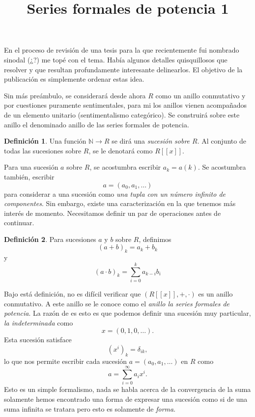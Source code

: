 \documentclass[letter,10pt,notitlepage]{article}
\title{Series formales de potencia 1}
\date{}
\theoremstyle{definition}
\newtheorem{definition}{Definición}
\theoremstyle{remark}
\begin{document}
\maketitle

En el proceso de revisión de una tesis para la que 
recientemente fui nombrado sinodal (¿?) me topé con 
el tema. Había algunos detalles quisquillosos que resolver
y que resultan profundamente interesante delinearlos. 
El objetivo de la publicación es simplemente ordenar 
estas idea.

Sin más preámbulo, se considerará desde ahora \( R\) 
como un anillo conmutativo y por cuestiones puramente 
sentimentales, para mi los anillos vienen acompañados de 
un elemento unitario (sentimentalismo categórico). 
Se construirá sobre este anillo el denominado anillo 
de las series formales de potencia.

\begin{definition}
  Una función \( \mathbb{N} \to R \) se dirá una 
  \emph{sucesión sobre \( R\)}. Al conjunto de todas 
  las sucesiones sobre \(R\), se le denotará como 
  \( R[[x]]\).
\end{definition}

Para una sucesión \(a\) sobre \(R\), se acostumbra 
escribir \(a_k = a(k)\). Se acostumbra también, escribir
\[ a = (a_0,a_1, \dots )\]
para considerar a una sucesión como 
\emph{una tupla con un número infinito de componentes}. 
Sin embargo, existe una caracterización en la que tenemos 
más interés de momento. Necesitamos definir un par de 
operaciones antes de continuar.

\begin{definition}
  Para sucesiones \(a\) y \(b\) sobre \(R\), definimos
  \[ (a + b)_k = a_k + b_k \]
  y
  \[ (a \cdot b)_k = \sum_{i=0}^ka_{k-i}b_{i}\]
\end{definition}

Bajo está definición, no es difícil verificar que 
\( (R[[x]],+,\cdot) \) es un anillo conmutativo. 
A este anillo se le conoce como el \textit{anillo la 
series formales de potencia}. La razón de es esto es 
que podemos definir una sucesión muy particular, 
\textit{la indeterminada} como
\[ x = (0,1,0,\ldots).\]
Esta sucesión satisface
\[ (x^i)_k = \delta_{ik},\]
lo que nos permite escribir cada sucesión 
\( a = (a_0, a_1, \ldots)\) en \( R\) como
\[ a = \sum_{i=0}^{\infty}a_ix^i.\]
Esto es un simple formalismo, nada se habla acerca 
de la convergencia de la suma solamente hemos encontrado una
forma de expresar una sucesión como si de una suma 
infinita se tratara pero esto es solamente de \emph{forma}.
\end{document}
